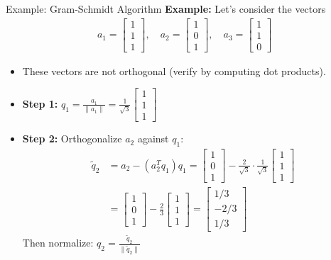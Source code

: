 \begin{frame}{Example: Gram-Schmidt Algorithm}
\textbf{Example:} Let's consider the vectors 
\begin{align*}
    a_1 = \begin{bmatrix} 1 \\ 1 \\ 1 \end{bmatrix}, \quad 
    a_2 = \begin{bmatrix} 1 \\ 0 \\ 1 \end{bmatrix}, \quad 
    a_3 = \begin{bmatrix} 1 \\ 1 \\ 0 \end{bmatrix}
\end{align*}

\begin{itemize}
    \item These vectors are not orthogonal (verify by computing dot products).
    \item \textbf{Step 1:} $q_1 = \frac{a_1}{\|a_1\|} = \frac{1}{\sqrt{3}} \begin{bmatrix} 1 \\ 1 \\ 1 \end{bmatrix}$
\end{itemize}
\end{frame}
\begin{frame}
    \begin{itemize}
       \item \textbf{Step 2:} Orthogonalize $a_2$ against $q_1$:
    \begin{align*}
        \tilde{q}_2 &= a_2 - (a_2^T q_1) q_1 = \begin{bmatrix} 1 \\ 0 \\ 1 \end{bmatrix} - \frac{2}{\sqrt{3}} \cdot \frac{1}{\sqrt{3}} \begin{bmatrix} 1 \\ 1 \\ 1 \end{bmatrix} \\
        &= \begin{bmatrix} 1 \\ 0 \\ 1 \end{bmatrix} - \frac{2}{3} \begin{bmatrix} 1 \\ 1 \\ 1 \end{bmatrix} = \begin{bmatrix} 1/3 \\ -2/3 \\ 1/3 \end{bmatrix}
    \end{align*}
    Then normalize: $q_2 = \frac{\tilde{q}_2}{\|\tilde{q}_2\|}$
    \end{itemize}
\end{frame}

